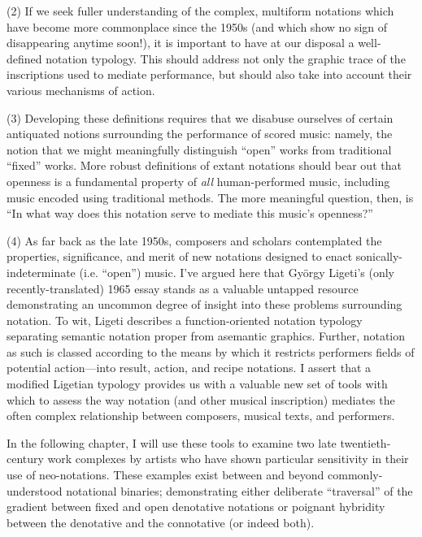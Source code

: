 (2) If we seek fuller understanding of the complex, multiform notations which have become more commonplace since the 1950s (and which show no sign of disappearing anytime soon!), it is important to have at our disposal a well-defined notation typology. This should address not only the graphic trace of the inscriptions used to mediate performance, but should also take into account their various mechanisms of action.

(3) Developing these definitions requires that we disabuse ourselves of certain antiquated notions surrounding the performance of scored music: namely, the notion that we might meaningfully distinguish ``open'' works from traditional ``fixed'' works. More robust definitions of extant notations should bear out that openness is a fundamental property of \textit{all} human-performed music, including music encoded using traditional methods. The more meaningful question, then, is ``In what way does this notation serve to mediate this music's openness?''

(4) As far back as the late 1950s, composers and scholars contemplated the properties, significance, and merit of new notations designed to enact sonically-indeterminate (i.e. ``open'') music. I've argued here that György Ligeti's (only recently-translated) 1965 essay stands as a valuable untapped resource demonstrating an uncommon degree of insight into these problems surrounding notation. To wit, Ligeti describes a function-oriented notation typology separating semantic notation proper from asemantic graphics. Further, notation as such is classed according to the means by which it restricts performers fields of potential action---into result, action, and recipe notations. I assert that a modified Ligetian typology provides us with a valuable new set of tools with which to assess the way notation (and other musical inscription) mediates the often complex relationship between composers, musical texts, and performers.

In the following chapter, I will use these tools to examine two late twentieth-century work complexes by artists who have shown particular sensitivity in their use of neo-notations. These examples exist between and beyond commonly-understood notational binaries; demonstrating either deliberate ``traversal'' of the gradient between fixed and open denotative notations or poignant hybridity between the denotative and the connotative (or indeed both). 


